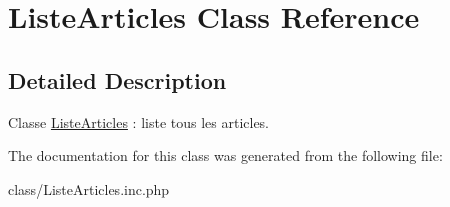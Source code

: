 \hypertarget{class_liste_articles}{
\section{ListeArticles Class Reference}
\label{class_liste_articles}
}


\subsection{Detailed Description}
Classe \hyperlink{class_liste_articles}{ListeArticles} : liste tous les articles. 

The documentation for this class was generated from the following file:\begin{DoxyCompactItemize}
\item 
class/ListeArticles.inc.php\end{DoxyCompactItemize}
